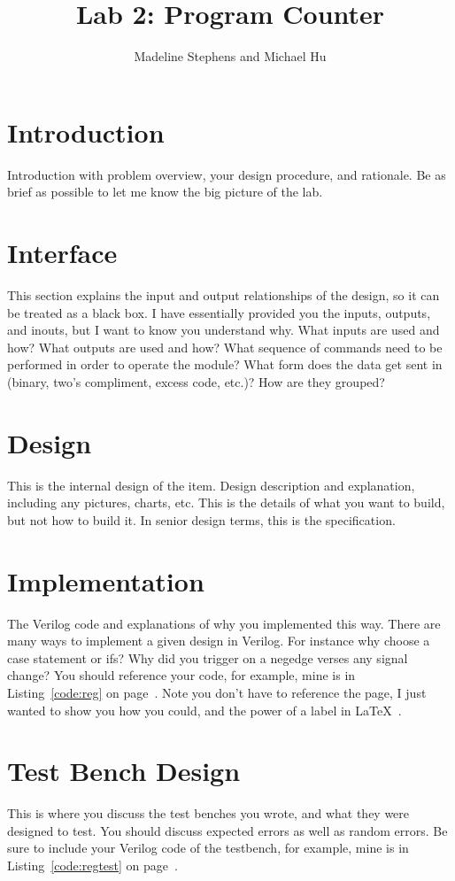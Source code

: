 \documentclass{article}
\author{Madeline Stephens and Michael Hu}
\title{Lab 2: Program Counter}
\newcommand{\Verilog}[3]{
  \lstset{language=Verilog}
  \lstset{backgroundcolor=\color{listinggray},rulecolor=\color{blue}}
  \lstset{linewidth=\textwidth}
  \lstset{commentstyle=\textit, stringstyle=\upshape,showspaces=false}
  \lstset{frame=tb}
  
}
\begin{document}
\maketitle

\section{Introduction}
Introduction with problem overview, your design procedure, and rationale.  Be as brief as possible to let me know the big picture of the lab.

\section{Interface}
This section explains the input and output relationships of the design, so it can be treated as a black box.  I have essentially provided you the inputs, outputs, and inouts, but I want to know you understand why.  What inputs are used and how?  What outputs are used and how?  What sequence of commands need to be performed in order to operate the module?  What form does the data get sent in (binary, two's compliment, excess code, etc.)?  How are they grouped?

\section{Design}
This is the internal design of the item.  Design description and explanation, including any pictures, charts, etc.  This is the details of what you want to build, but not how to build it.  In senior design terms, this is the specification.

\section{Implementation}
The Verilog code and explanations of why you implemented this way.  There are many ways to implement a given design in Verilog.  For instance why choose a case statement or ifs?  Why did you trigger on a negedge verses any signal change?  You should reference your code, for example, mine is in Listing~\ref{code:reg} on page~\pageref{code:reg}.  Note you don't have to reference the page, I just wanted to show you how you could, and the power of a label in \LaTeX\ .

\Verilog{Verilog code for implementing a register.}{code:reg}{../code/register.v}

\section{Test Bench Design}
This is where you discuss the test benches you wrote, and what they were designed to test.  You should discuss expected errors as well as random errors.  Be sure to include your Verilog code of the testbench, for example, mine is in Listing~\ref{code:regtest} on page~\pageref{code:regtest}.
\end{document}
